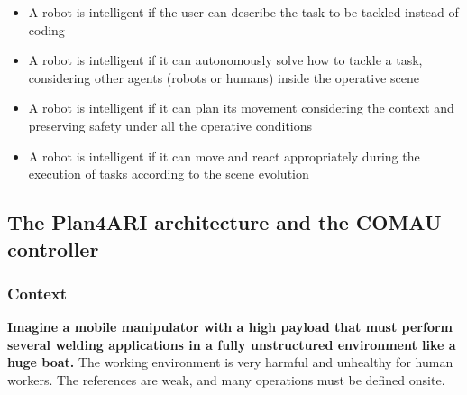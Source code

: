 \begin{itemize}[arrow]
\item
  A robot is intelligent if the user can describe the task to be tackled
  instead of coding
\item
  A robot is intelligent if it can autonomously solve how to tackle a
  task, considering other agents (robots or humans) inside the operative
  scene
\item
  A robot is intelligent if it can plan its movement considering the
  context and preserving safety under all the operative conditions
\item
  A robot is intelligent if it can move and react appropriately during
  the execution of tasks according to the scene evolution
\end{itemize}


\clearpage
\subsection{The Plan4ARI architecture and the COMAU
controller}\label{the-plan4ari-architecture-and-the-comau-controller}

\subsubsection{Context}\label{context}

\textbf{Imagine a mobile manipulator with a high payload that must
perform several welding applications in a fully unstructured environment
like a huge boat.} The working environment is very harmful and unhealthy
for human workers. The references are weak, and many operations must be
defined onsite.

